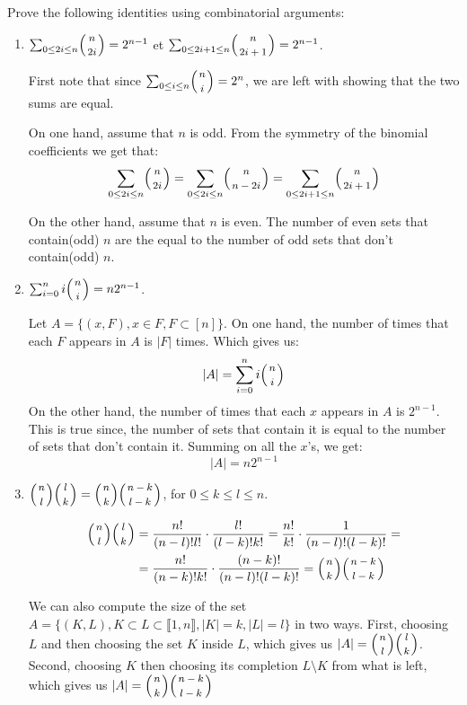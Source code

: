 \documentclass[a4paper,11pt]{exam}
\renewcommand{\binom}{\mbinom}
\begin{document}
\begin{questions}
		\question 
		Prove the following identities using combinatorial arguments:
		\begin{enumerate}
			\item $\sum_{0 \leq 2i \leq n} \binom{n}{2i} = 2^{n-1}$ et 
			$\sum_{0 \leq 2i+1 \leq n} \binom{n}{2i+1} = 2^{n-1}$.
			
			\begin{solution}
				First note that since $\sum_{0 \leq i \leq n} \binom{n}{i} = 2^{n}$, we are left with showing that the two sums are equal.
				
				On one hand, assume that $n$  is odd. From the symmetry of the binomial coefficients we get that:
				\[
					\sum_{0 \leq 2i \leq n} \binom{n}{2i} = \sum_{0 \leq 2i \leq n} \binom{n}{n-2i} = \sum_{0 \leq 2i+1 \leq n} \binom{n}{2i+1}	
				\]
				
				On the other hand, assume that $n$ is even. The number of even sets that contain(odd) $n$ are the equal to the number of odd sets that don't contain(odd) $n$.
				
			\end{solution}
			
			\item $\sum_{i=0}^n i \binom{n}{i} = n2^{n-1}$.
			
			\begin{solution}
				 Let $A = \{(x,F), x \in F ,F\subset [n]\}$. On one hand, the number of times that each $F$ appears in $A$ is $|F|$ times. Which gives us:
				 \[
				 	|A| = \sum_{i=0}^n i \binom{n}{i}
				 \]  
				 On the other hand, the number of times that each $x$ appears in $A$ is $2^{n-1}$. This is true since, the number of sets that contain it is equal to the number of sets that don't contain it. Summing on all the $x$'s, we get:
				 \[
				 |A| = n2^{n-1}
				 \]  
			\end{solution}
			
			\item $\binom{n}{l}\binom{l}{k} = \binom{n}{k}\binom{n-k}{l-k}$, 
			for $0 \leq k \leq l \leq n$.
			
			\begin{solution}
				\begin{align*}
				\binom{n}{l}\binom{l}{k} & =\frac{n!}{(n-l)!l!}\cdot \frac{l!}{(l-k)!k!} = \frac{n!}{k!}\cdot \frac{1}{(n-l)!(l-k)!}=\\
				& =\frac{n!}{(n-k)!k!} \cdot\frac{(n-k)!}{(n-l)!(l-k)!} = \binom{n}{k}\binom{n-k}{l-k}
				\end{align*}

				We can also compute the size of the set $A = \{ (K,L), K \subset L \subset \llbracket 1,n \rrbracket, |K| = k, |L| = l \}$ in two ways. First, choosing $L$ and then choosing the set $K$ inside $L$, which gives us $|A| = \binom{n}{l}\binom{l}{k}$. Second, choosing $K$ then choosing its completion $L\setminus K$ from what is left, which gives us $|A|=\binom{n}{k}\binom{n-k}{l-k}$
			

\end{solution}
\end{enumerate}
\end{questions}
\end{document}
